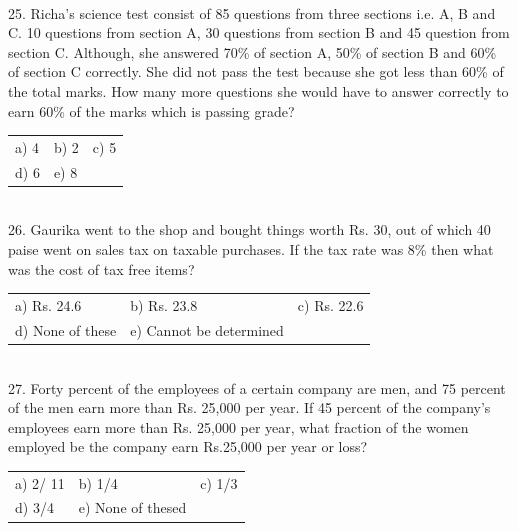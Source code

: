 \documentclass{article}
\begin{document}
\noindent 

\noindent 

\noindent \\
25. Richa's science test consist of 85 questions from three sections i.e. A, B and C. 10 questions from section A, 30 questions from section B and 45 question from section C. Although, she answered 70\% of section A, 50\% of section B and 60\% of section C correctly. She did not pass the test because she got less than 60\% of the total marks. How many more questions she would have to answer correctly to earn 60\% of the marks which is passing grade?



\begin{tabular}{p{1.7in} p{1.6in} p{1.6in}} \\ 
	a) 4 & b) 2  & c) 5 \\
	d) 6 &     e) 8  \\
\end{tabular}

\noindent 

\noindent 

\noindent \\
 26. Gaurika went to the shop and bought things worth Rs. 30, out of which 40 paise went on sales tax on taxable purchases. If the tax rate was 8\% then what was the cost of tax free items?

\noindent 

\begin{tabular}{p{1.7in} p{1.6in} p{1.6in}} \\ 
a) Rs. 24.6 & b) Rs. 23.8  & c) Rs. 22.6 \\
d) None of these &     e) Cannot be determined  \\
\end{tabular}



\noindent 

\noindent \\
27. Forty percent of the employees of a certain company are men, and 75 percent of the men earn more than Rs. 25,000 per year. If 45 percent of the company's employees earn more than Rs. 25,000 per year, what fraction of the women employed be the company earn Rs.25,000 per year or loss?

\noindent 
\begin{tabular}{p{1.7in} p{1.6in} p{1.6in}} \\ 
	a) 2/ 11  & b) 1/4   &  c) 1/3 \\
 d) 3/4  &    e) None of thesed  \\
\end{tabular}
\noindent                                                            
\end{document}

